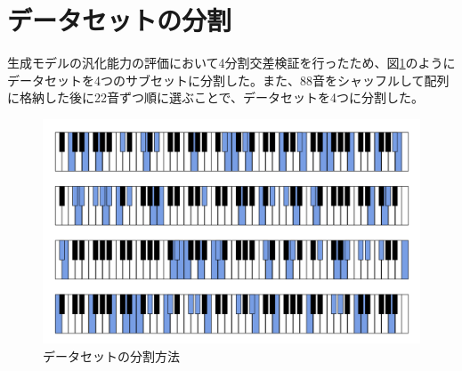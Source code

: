 
\section{データセットの分割}
\label{sec:appendix_split}

生成モデルの汎化能力の評価において4分割交差検証を行ったため、図\ref{fig:data_div}のようにデータセットを4つのサブセットに分割した。また、88音をシャッフルして配列に格納した後に22音ずつ順に選ぶことで、データセットを4つに分割した。

\begin{figure}[t]
\begin{center}
\includegraphics[width=\hsize]{figure/data_div.png}
\caption{データセットの分割方法}
\label{fig:data_div}
\end{center}
\end{figure}

